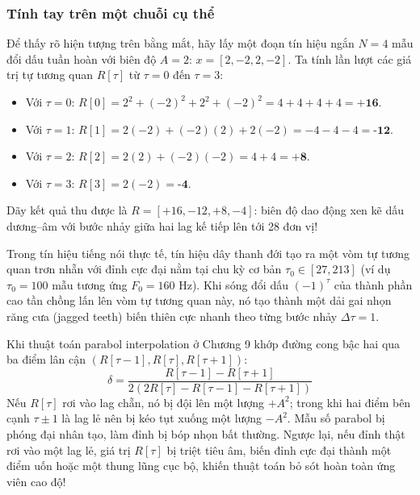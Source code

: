 \subsubsection*{Tính tay trên một chuỗi cụ thể}
Để thấy rõ hiện tượng trên bằng mắt, hãy lấy một đoạn tín hiệu ngắn $N = 4$ mẫu đổi dấu tuần hoàn với biên độ $A = 2$: $x = [2, -2, 2, -2]$. Ta tính lần lượt các giá trị tự tương quan $R[\tau]$ từ $\tau = 0$ đến $\tau = 3$:
\begin{itemize}[leftmargin=1.5em, itemsep=2pt]
    \item Với $\tau = 0$: $R[0] = 2^2 + (-2)^2 + 2^2 + (-2)^2 = 4 + 4 + 4 + 4 = \textbf{+16}$.
    \item Với $\tau = 1$: $R[1] = 2(-2) + (-2)(2) + 2(-2) = -4 - 4 - 4 = \textbf{-12}$.
    \item Với $\tau = 2$: $R[2] = 2(2) + (-2)(-2) = 4 + 4 = \textbf{+8}$.
    \item Với $\tau = 3$: $R[3] = 2(-2) = \textbf{-4}$.
\end{itemize}
Dãy kết quả thu được là $R = [+16, -12, +8, -4]$: biên độ dao động xen kẽ dấu dương--âm với bước nhảy giữa hai lag kế tiếp lên tới 28 đơn vị!

Trong tín hiệu tiếng nói thực tế, tín hiệu dây thanh đới tạo ra một vòm tự tương quan trơn nhẵn với đỉnh cực đại nằm tại chu kỳ cơ bản $\tau_0 \in [27, 213]$ (ví dụ $\tau_0 = 100$ mẫu tương ứng $F_0 = 160\text{ Hz}$). Khi sóng đổi dấu $(-1)^\tau$ của thành phần cao tần chồng lấn lên vòm tự tương quan này, nó tạo thành một dải gai nhọn răng cưa (jagged teeth) biến thiên cực nhanh theo từng bước nhảy $\Delta \tau = 1$. 

Khi thuật toán parabol interpolation ở Chương 9 khớp đường cong bậc hai qua ba điểm lân cận $(R[\tau-1], R[\tau], R[\tau+1])$:
\begin{equation}
\delta = \frac{R[\tau-1] - R[\tau+1]}{2(2R[\tau] - R[\tau-1] - R[\tau+1])}
\end{equation}
Nếu $R[\tau]$ rơi vào lag chẵn, nó bị đội lên một lượng $+A^2$; trong khi hai điểm bên cạnh $\tau \pm 1$ là lag lẻ nên bị kéo tụt xuống một lượng $-A^2$. Mẫu số parabol bị phóng đại nhân tạo, làm đỉnh bị bóp nhọn bất thường. Ngược lại, nếu đỉnh thật rơi vào một lag lẻ, giá trị $R[\tau]$ bị triệt tiêu âm, biến đỉnh cực đại thành một điểm uốn hoặc một thung lũng cục bộ, khiến thuật toán bỏ sót hoàn toàn ứng viên cao độ!

